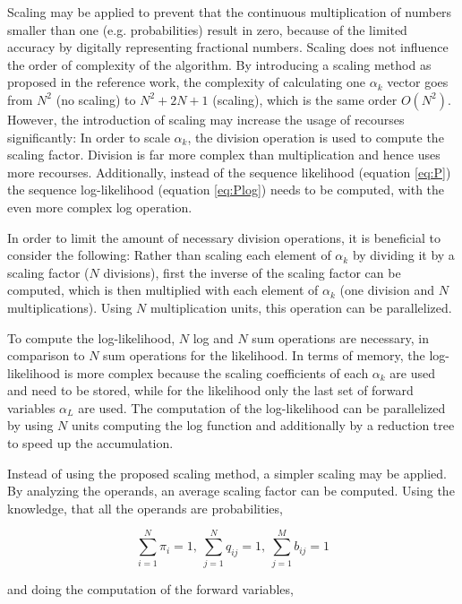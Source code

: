 \documentclass[mscthesis]{usiinfthesis}
\begin{document}
Scaling may be applied to prevent that the continuous multiplication of numbers
smaller than one (e.g. probabilities) result in zero, because of the limited
accuracy by digitally representing fractional numbers. Scaling does not
influence the order of complexity of the algorithm. By introducing a scaling
method as proposed in the reference work, the complexity of calculating one
$\alpha_k$ vector goes from $N^2$ (no scaling) to $N^2 + 2N + 1$ (scaling),
which is the same order $O(N^2)$. However, the introduction of scaling may
increase the usage of recourses significantly: In order to scale $\alpha_k$,
the division operation is used to compute the scaling factor. Division is far
more complex than multiplication and hence uses more recourses. Additionally,
instead of the sequence likelihood (equation \ref{eq:P}) the sequence
log-likelihood (equation \ref{eq:Plog}) needs to be computed, with the even
more complex log operation.

In order to limit the amount of necessary division operations, it is beneficial
to consider the following: Rather than scaling each element of $\alpha_k$ by
dividing it by a scaling factor ($N$ divisions), first the inverse of the
scaling factor can be computed, which is then multiplied with each element of
$\alpha_k$ (one division and $N$ multiplications). Using $N$ multiplication
units, this operation can be parallelized.

To compute the log-likelihood, $N$ log and $N$ sum operations are necessary, in
comparison to $N$ sum operations for the likelihood. In terms of memory, the
log-likelihood is more complex because the scaling coefficients of each
$\alpha_k$ are used and need to be stored, while for the likelihood only the
last set of forward variables $\alpha_L$ are used. The computation of the
log-likelihood can be parallelized by using $N$ units computing the log
function and additionally by a reduction tree to speed up the accumulation.

Instead of using the proposed scaling method, a simpler scaling may be applied.
By analyzing the operands, an average scaling factor can be computed. Using the
knowledge, that all the operands are probabilities,

\begin{equation}
    \label{eq:scaling_sum}
    \sum\limits_{i=1}^{N} \pi_i = 1, \
    \sum\limits_{j=1}^{N} q_{ij} = 1, \
    \sum\limits_{j=1}^{M} b_{ij} = 1
\end{equation}

and doing the computation of the forward variables,
\end{document}
